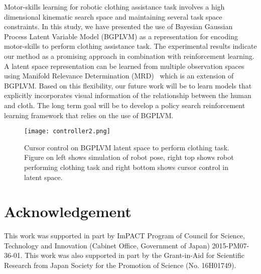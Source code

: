 \documentclass[a4paper]{article}
\begin{document}
Motor-skills learning for robotic clothing assistance task involves a high dimensional kinematic search space and maintaining several task space constraints. In this study, we have presented the use of Bayesian Gaussian Process Latent Variable Model (BGPLVM) as a representation for encoding motor-skills to perform clothing assistance task. The experimental results indicate our method as a promising approach in combination with reinforcement learning. A latent space representation can be learned from multiple observation spaces using Manifold Relevance Determination (MRD)~\cite{mrd} which is an extension of BGPLVM. Based on this flexibility, our future work will be to learn models that explicitly incorporates visual information of the relationship between the human and cloth. The long term goal will be to develop a policy search reinforcement learning framework that relies on the use of BGPLVM.

\begin{figure}[t]
  \centering
  \texttt{[image: controller2.png]}
  \caption{Cursor control on BGPLVM latent space to perform clothing task. Figure on left shows simulation of robot pose, right top shows robot performing clothing task and right bottom shows cursor control in latent space.}
  \label{figure:controller}
\end{figure}

\section*{Acknowledgement}
This work was supported in part by ImPACT Program of Council for Science, Technology and Innovation (Cabinet Office, Government of Japan) 2015-PM07-36-01. This work was also supported in part by the Grant-in-Aid for Scientific Research from Japan Society for the Promotion of Science (No. 16H01749).
\end{document}
